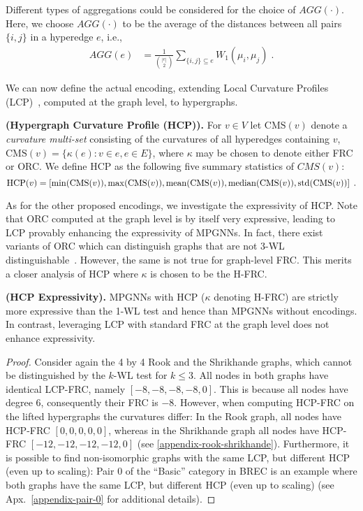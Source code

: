 Different types of aggregations could be considered for the choice of $AGG(\cdot)$. Here, we choose $AGG(\cdot)$ to be the average of the distances  between all  pairs $\{i,j\}$ in a hyperedge $e$, i.e.,
\begin{align} 
AGG (e) 
& =\frac{1}{{|e|\choose2}} \sum_{\{i,j\} \subseteq e } W_1(\mu_i, \mu_j) \; .
\end{align}


We can now define the actual encoding, extending Local Curvature Profiles (LCP)~\citep{fesser2023effective}, computed at the graph level, to hypergraphs.

\begin{defn}\label{def:hcp} \textbf{(Hypergraph Curvature Profile (HCP)).} For  \( v \in V \) let \( \text{CMS}(v) \) denote a \emph{curvature multi-set} consisting of the curvatures of all hyperedges containing $v$,
$\text{CMS}(v) = \{\kappa(e) : v \in e, e \in E\}$,
where $\kappa$ may be chosen to denote either FRC or ORC. We define HCP
as the following five summary statistics of $CMS(v)$:
\begin{equation}\label{HCP}
    \text{HCP}(v) = \left[\min(\text{CMS}(v)), \max(\text{CMS}(v)), {\rm mean}(\text{CMS}(v)), 
    {\rm median}(\text{CMS}(v)), {\rm std}(\text{CMS}(v)) \right] \; .
\end{equation}
\end{defn}
%
As for the other proposed encodings, we investigate the expressivity of HCP.
Note that ORC computed at the graph level is by itself very expressive, leading to LCP provably enhancing the expressivity of MPGNNs. In fact, there exist variants of ORC which can distinguish graphs that are not 3-WL distinguishable~\citep{southern2023expressive}. However, the same is not true for graph-level FRC. This merits a closer analysis of HCP where $\kappa$ is chosen to be the H-FRC.\\
%
\begin{theorem}\label{thm:hcp_exp} \textbf{(HCP Expressivity).} MPGNNs with HCP ($\kappa$ denoting H-FRC) are strictly more expressive than the 1-WL test and hence than MPGNNs without encodings. In contrast, leveraging LCP with standard FRC at the graph level does not enhance expressivity.
\end{theorem}

\begin{proof}
Consider again the 4 by 4 Rook and the Shrikhande graphs, which cannot be distinguished by the $k$-WL test for $k \leq 3$.
All nodes in both graphs have identical LCP-FRC, namely $[-8, -8, -8, -8, 0]$. This is because all nodes have degree $6$, consequently their FRC is $-8$. However, when computing HCP-FRC on the lifted hypergraphs the curvatures differ: In the Rook graph, all nodes have HCP-FRC $[0, 0, 0, 0, 0]$, whereas in the Shrikhande graph all nodes have HCP-FRC $[-12, -12, -12, -12,  0]$ (see \ref{appendix-rook-shrikhande}). Furthermore, it is possible to find non-isomorphic graphs with the same LCP, but different HCP (even up to scaling): Pair 0 of the “Basic” category in BREC is an example where both graphs have the same LCP, but different HCP (even up to scaling) (see Apx.~\ref{appendix-pair-0} for additional details).
\end{proof}

